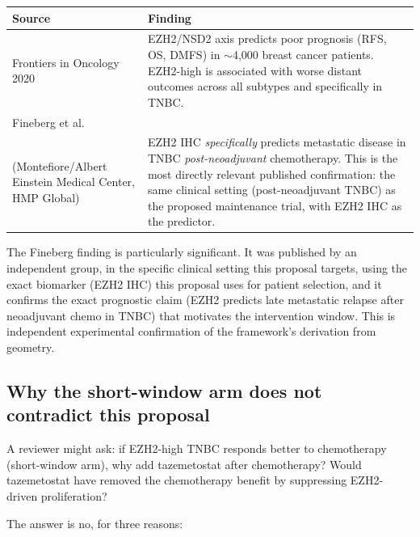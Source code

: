 \documentclass[12pt, a4paper]{article}
\begin{document}
\begin{center}
\begin{tabular}{p{4cm}p{9cm}}
\toprule
\textbf{Source} & \textbf{Finding} \\
\midrule
Frontiers in Oncology 2020
& EZH2/NSD2 axis predicts poor
  prognosis (RFS, OS, DMFS) in
  $\sim$4,000 breast cancer patients.
  EZH2-high is associated with
  worse distant outcomes across
  all subtypes and specifically
  in TNBC. \\[0.4em]
Fineberg et al.\\
(Montefiore/Albert Einstein
Medical Center, HMP Global)
& EZH2 IHC \textit{specifically}
  predicts metastatic disease in
  TNBC \textit{post-neoadjuvant}
  chemotherapy. This is the most
  directly relevant published
  confirmation: the same clinical
  setting (post-neoadjuvant TNBC)
  as the proposed maintenance trial,
  with EZH2 IHC as the predictor. \\
\bottomrule
\end{tabular}
\end{center}

\noindent The Fineberg finding is particularly
significant. It was published by an independent
group, in the specific clinical setting this proposal
targets, using the exact biomarker (EZH2 IHC) this
proposal uses for patient selection, and it confirms
the exact prognostic claim (EZH2 predicts late
metastatic relapse after neoadjuvant chemo in TNBC)
that motivates the intervention window. This is
independent experimental confirmation of the
framework's derivation from geometry.

\subsection{Why the short-window arm does not
contradict this proposal}

A reviewer might ask: if EZH2-high TNBC responds
better to chemotherapy (short-window arm), why add
tazemetostat after chemotherapy? Would tazemetostat
have removed the chemotherapy benefit by suppressing
EZH2-driven proliferation?

The answer is no, for three reasons:
\end{document}
